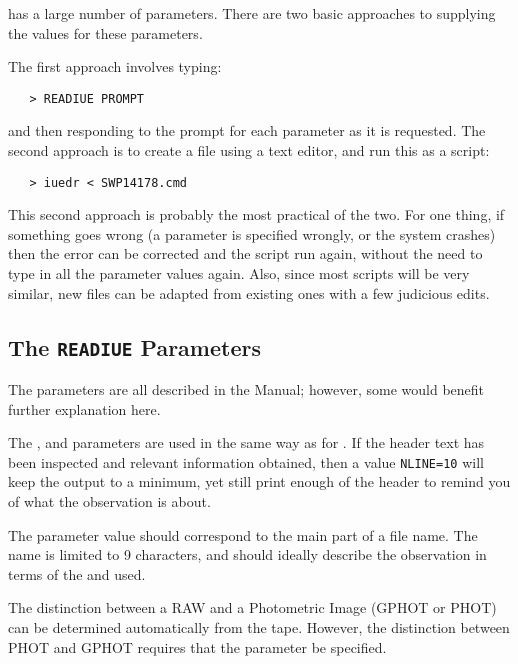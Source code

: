  has a large number of parameters.
There are two basic approaches to supplying the values for these parameters.

The first approach involves typing:

\begin{verbatim}
   > READIUE PROMPT
\end{verbatim}

and then responding to the prompt for each parameter as it is requested.
The second approach is to create a file using a text editor, and run this as a
script:

\begin{verbatim}
   > iuedr < SWP14178.cmd
\end{verbatim}

This second approach is probably the most practical of the two.  For one
thing, if something goes wrong (a parameter is specified wrongly, or the
system crashes) then the error can be corrected and the script run again,
without the need to type in all the parameter values again.  Also, since most
scripts will be very similar, new files can be adapted from existing ones
with a few judicious edits.


\subsection{The {\tt READIUE} Parameters}

The  parameters are all described in the
Manual; however, some would benefit further explanation here.

The , 
and  parameters are used in the same
way as for \@.  If the header text
has been inspected and relevant information obtained, then a value
\verb+NLINE=10+ will keep the output to a minimum, yet still print enough
of the header to remind you of what the observation is about.

The  parameter value should correspond to
the main part of a file name.  The name is limited to 9 characters, and
should ideally describe the observation in terms of the
 and 
 used.

The distinction between a RAW and a Photometric Image (GPHOT or PHOT) can
be determined automatically from the tape. However, the distinction between
PHOT and GPHOT requires that the 
 parameter be specified.

